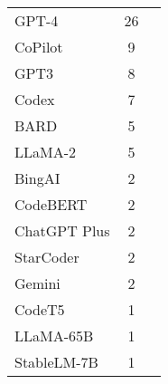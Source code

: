 \begin{table}[ht]
\begin{tabular}{l c p{4cm}}
		GPT-4 & 26 \\
		CoPilot & 9 \\
		GPT3 & 8 \\
		Codex & 7 \\
		BARD & 5 \\
		LLaMA-2 & 5 \\
		BingAI & 2 \\
		CodeBERT & 2 \\
		ChatGPT Plus & 2 \\
		StarCoder & 2 \\
		Gemini & 2 \\
		CodeT5 & 1 \\
		LLaMA-65B & 1 \\
		StableLM-7B & 1 \\

\end{tabular}
\end{table}
